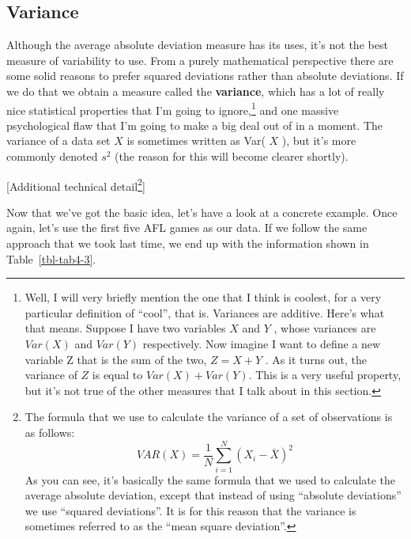 \documentclass[
  a4paper,
]{book}
\begin{document}
\hypertarget{variance}{%
\subsection{Variance}\label{variance}}

Although the average absolute deviation measure has its uses, it's not
the best measure of variability to use. From a purely mathematical
perspective there are some solid reasons to prefer squared deviations
rather than absolute deviations. If we do that we obtain a measure
called the \textbf{variance}, which has a lot of really nice statistical
properties that I'm going to ignore,\footnote{Well, I will very briefly
  mention the one that I think is coolest, for a very particular
  definition of ``cool'', that is. Variances are additive. Here's what
  that means. Suppose I have two variables \(X\) and \(Y\) , whose
  variances are \(Var(X)\) and \(Var(Y)\) respectively. Now imagine I
  want to define a new variable Z that is the sum of the two,
  \(Z = X + Y\) . As it turns out, the variance of \(Z\) is equal to
  \(Var(X) + Var(Y)\). This is a very useful property, but it's not true
  of the other measures that I talk about in this section.} and one
massive psychological flaw that I'm going to make a big deal out of in a
moment. The variance of a data set \(X\) is sometimes written as Var(
\(X\) ), but it's more commonly denoted \(s^2\) (the reason for this
will become clearer shortly).

{[}Additional technical detail\footnote{The formula that we use to
  calculate the variance of a set of observations is as follows:
  \[VAR(X) =\frac{1}{N} \sum_{i=1}^{N} ( X_i - \bar{X} )^2\] As you can
  see, it's basically the same formula that we used to calculate the
  average absolute deviation, except that instead of using ``absolute
  deviations'' we use ``squared deviations''. It is for this reason that
  the variance is sometimes referred to as the ``mean square
  deviation''.}{]}

Now that we've got the basic idea, let's have a look at a concrete
example. Once again, let's use the first five AFL games as our data. If
we follow the same approach that we took last time, we end up with the
information shown in Table~\ref{tbl-tab4-3}.

\hypertarget{tbl-tab4-3}{}
 
  \providecommand{\huxb}[2]{\arrayrulecolor[RGB]{#1}\global\arrayrulewidth=#2pt}
  \providecommand{\huxvb}[2]{\color[RGB]{#1}\vrule width #2pt}
  \providecommand{\huxtpad}[1]{\rule{0pt}{#1}}
  \providecommand{\huxbpad}[1]{\rule[-#1]{0pt}{#1}}
\end{document}
